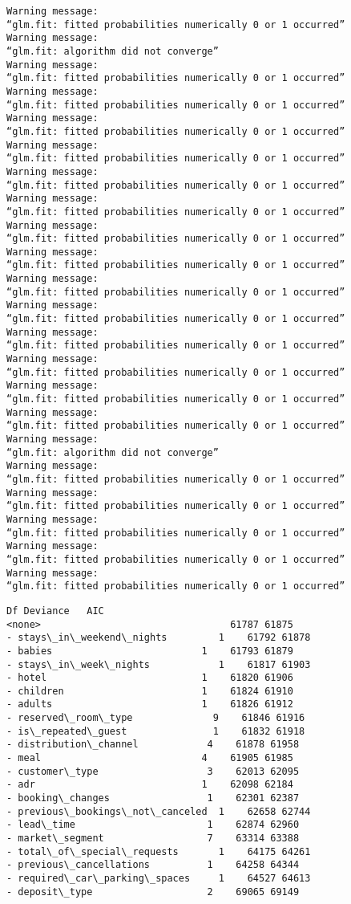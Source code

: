 \documentclass[11pt]{article}
\begin{document}
    \begin{Verbatim}[commandchars=\\\{\}]
Warning message:
“glm.fit: fitted probabilities numerically 0 or 1 occurred”
Warning message:
“glm.fit: algorithm did not converge”
Warning message:
“glm.fit: fitted probabilities numerically 0 or 1 occurred”
Warning message:
“glm.fit: fitted probabilities numerically 0 or 1 occurred”
Warning message:
“glm.fit: fitted probabilities numerically 0 or 1 occurred”
Warning message:
“glm.fit: fitted probabilities numerically 0 or 1 occurred”
Warning message:
“glm.fit: fitted probabilities numerically 0 or 1 occurred”
Warning message:
“glm.fit: fitted probabilities numerically 0 or 1 occurred”
Warning message:
“glm.fit: fitted probabilities numerically 0 or 1 occurred”
Warning message:
“glm.fit: fitted probabilities numerically 0 or 1 occurred”
Warning message:
“glm.fit: fitted probabilities numerically 0 or 1 occurred”
Warning message:
“glm.fit: fitted probabilities numerically 0 or 1 occurred”
Warning message:
“glm.fit: fitted probabilities numerically 0 or 1 occurred”
Warning message:
“glm.fit: fitted probabilities numerically 0 or 1 occurred”
Warning message:
“glm.fit: fitted probabilities numerically 0 or 1 occurred”
Warning message:
“glm.fit: fitted probabilities numerically 0 or 1 occurred”
Warning message:
“glm.fit: algorithm did not converge”
Warning message:
“glm.fit: fitted probabilities numerically 0 or 1 occurred”
Warning message:
“glm.fit: fitted probabilities numerically 0 or 1 occurred”
Warning message:
“glm.fit: fitted probabilities numerically 0 or 1 occurred”
Warning message:
“glm.fit: fitted probabilities numerically 0 or 1 occurred”
Warning message:
“glm.fit: fitted probabilities numerically 0 or 1 occurred”
    \end{Verbatim}

    \begin{Verbatim}[commandchars=\\\{\}]
                                 Df Deviance   AIC
<none>                                 61787 61875
- stays\_in\_weekend\_nights         1    61792 61878
- babies                          1    61793 61879
- stays\_in\_week\_nights            1    61817 61903
- hotel                           1    61820 61906
- children                        1    61824 61910
- adults                          1    61826 61912
- reserved\_room\_type              9    61846 61916
- is\_repeated\_guest               1    61832 61918
- distribution\_channel            4    61878 61958
- meal                            4    61905 61985
- customer\_type                   3    62013 62095
- adr                             1    62098 62184
- booking\_changes                 1    62301 62387
- previous\_bookings\_not\_canceled  1    62658 62744
- lead\_time                       1    62874 62960
- market\_segment                  7    63314 63388
- total\_of\_special\_requests       1    64175 64261
- previous\_cancellations          1    64258 64344
- required\_car\_parking\_spaces     1    64527 64613
- deposit\_type                    2    69065 69149
    \end{Verbatim}
\end{document}
